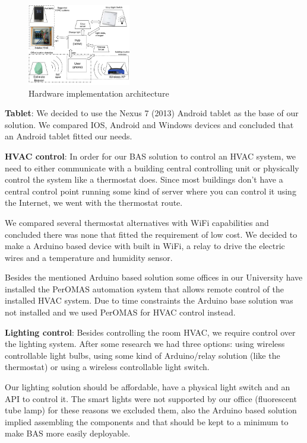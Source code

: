 \documentclass[conference]{IEEEtran}
\begin{document}
\begin{figure}[h]
\centering
\includegraphics[width=0.4\textwidth]{Figures/harware_arch_imp}
\caption{Hardware implementation architecture}
\label{imp:architecture_system}
\end{figure}

\textbf{Tablet}: We decided to use the Nexus 7 (2013) Android tablet as the base of our solution. We compared IOS, Android and Windows devices and concluded that an Android tablet fitted our needs.

\textbf{HVAC control}: In order for our \ac{BAS} solution to control an \ac{HVAC} system, we need to either communicate with a building central controlling unit or physically control the system like a thermostat does. Since most buildings don't have a central control point running some kind of server where you can control it using the Internet, we went with the thermostat route.

We compared several thermostat alternatives with WiFi capabilities and concluded there was none that fitted the requirement of low cost. We decided to make a Arduino based device with built in \ac{WiFi}, a relay to drive the electric wires and a temperature and humidity sensor. 

Besides the mentioned Arduino based solution some offices in our University have installed the PerOMAS automation system that allows remote control of the installed HVAC system. Due to time constraints the Arduino base solution was not installed and we used PerOMAS for HVAC control instead.





\textbf{Lighting control}:
Besides controlling the room \ac{HVAC}, we require control over the lighting system. After some research we had three options: using wireless controllable light bulbs, using some kind of Arduino/relay solution (like the thermostat) or using a wireless controllable light switch.

Our lighting solution should be affordable, have a physical light switch and an API to control it. The smart lights were not supported by our office (fluorescent tube lamp) for these reasons we excluded them, also the Arduino based solution implied assembling the components and that should be kept to a minimum to make BAS more easily deployable.
\end{document}

